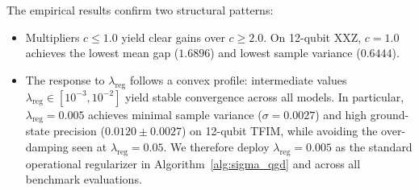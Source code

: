 \documentclass[11pt,a4paper]{article}
\begin{document}
\begin{table}[htbp]
\centering
\small
\caption{Consolidated sensitivity analysis across TFIM and XXZ models at 10 and 12 qubits ($N=15$ seeds, mean gap $\pm$ std). Multiplier $c$ is swept at fixed baseline $\lambda_{\text{reg}} = 0.001$, and $\lambda_{\text{reg}}$ is swept at fixed $c = 1.0$.}
\label{tab:sensitivity_consolidated}
\end{table}

The empirical results confirm two structural patterns:
\begin{itemize}
    \item Multipliers $c \le 1.0$ yield clear gains over $c \ge 2.0$. On 12-qubit XXZ, $c=1.0$ achieves the lowest mean gap ($1.6896$) and lowest sample variance ($0.6444$).
    \item The response to $\lambda_{\text{reg}}$ follows a convex profile: intermediate values $\lambda_{\text{reg}} \in [10^{-3}, 10^{-2}]$ yield stable convergence across all models. In particular, $\lambda_{\text{reg}} = 0.005$ achieves minimal sample variance ($\sigma = 0.0027$) and high ground-state precision ($0.0120 \pm 0.0027$) on 12-qubit TFIM, while avoiding the over-damping seen at $\lambda_{\text{reg}} = 0.05$. We therefore deploy $\lambda_{\text{reg}} = 0.005$ as the standard operational regularizer in Algorithm~\ref{alg:sigma_qgd} and across all benchmark evaluations.
\end{itemize}
\end{document}
